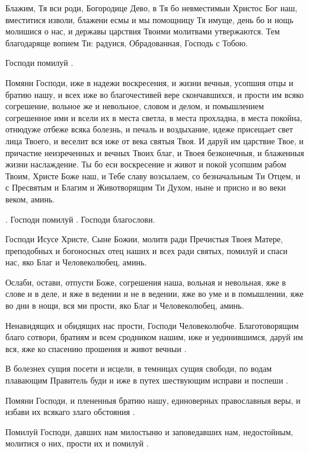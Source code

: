 \begin{mymulticols}
 Блажим, Тя вси роди, Богородице Дево, в Тя бо невместимыи Христос Бог наш, вместитися изволи, блажени есмы и мы помощницу Тя имуще, день бо и нощь молишися о нас, и державы царствия Твоими молитвами утвержаются. Тем благодаряще вопием Ти: радуися, Обрадованная, Господь с Тобою. 

Господи помилуй .


 Помяни Господи, иже в надежи воскресения, и жизни вечныя, усопшия отцы и братию нашу, и всех иже во благочестивей вере скончавшихся, и прости им всяко согрешение, вольное же и невольное, словом и делом, и помышлением согрешенное ими и всели их в места светла, в места прохладна, в места покойна, отнюдуже отбеже всяка болезнь, и печаль и воздыхание, идеже присещает свет лица Твоего, и веселит вся иже от века святыя Твоя. И даруй им царствие Твое, и причастие неизреченных и вечных Твоих благ, и Твоея безконечныя, и блаженныя жизни наслаждение. Ты бо еси воскресение и живот и покой усопшим рабом Твоим, Христе Боже наш, и Тебе славу возсылаем, со безначальным Ти Отцем, и с Пресвятым и Благим и Животворящим Ти Духом, ныне и присно и во веки веком, аминь. 

 . Господи помилуй . Господи благослови.

 Господи Исусе Христе, Сыне Божии, молитв ради Пречистыя Твоея Матере, преподобных и богоносных отец наших и всех ради святых, помилуй и спаси нас, яко Благ и Человеколюбец, аминь. 

 Ослаби, остави, отпусти Боже, согрешения наша, вольная и невольная, яже в слове и в деле, и яже в ведении и не в ведении, яже во уме и в помышлении, яже во дни в нощи, вся ми прости, яко Благ и Человеколюбец, аминь.


 Ненавидящих и обидящих нас прости, Господи Человеколюбче. Благотоворящим благо сотвори, братиям и всем сродником нашим, иже и уединившимся, даруй им вся, яже ко спасению прошения и живот вечныи . 

В болезнех сущия посети и исцели, в темницах сущия свободи, по водам плавающим Правитель буди и иже в путех шествующим исправи и поспеши . 

Помяни Господи, и плененныя братию нашу, единоверных православныя веры, и избави их всякаго злаго обстояния . 

Помилуй Господи, давших нам милостыню и заповедавших нам, недостойным, молитися о них, прости их и помилуй . 


\end{mymulticols}
